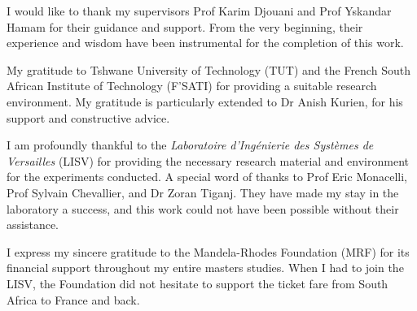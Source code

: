 
\addtolength{\topmargin}{-.875in}


\medskip
\par
I would like to thank my supervisors Prof Karim Djouani and Prof Yskandar
Hamam for their guidance and support. From the very beginning, their
experience and wisdom have been instrumental for the completion of this work.

\medskip

My gratitude to Tshwane University of Technology (TUT) and the French South
African Institute of Technology (F'SATI) for providing a suitable research
environment. My gratitude is particularly extended to Dr Anish Kurien, for
his support and constructive advice.

\medskip

I am profoundly thankful to the \emph{Laboratoire d'Ing\'{e}nierie des
Syst\`{e}mes de Versailles} (LISV) for providing the necessary research
material and environment for the experiments conducted. A special word of
thanks to Prof Eric Monacelli, Prof Sylvain Chevallier, and Dr Zoran Tiganj.
They have made my stay in the laboratory a success, and this work could not
have been possible without their assistance.

\medskip

I express my sincere gratitude to the Mandela-Rhodes Foundation (MRF) for its
financial support throughout my entire masters studies. When I had to join
the LISV, the Foundation did not hesitate to support the ticket fare from
South Africa to France and back.

